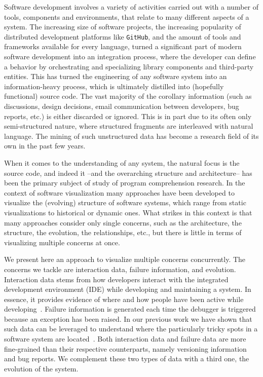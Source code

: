 Software development involves a variety of activities carried out with a number of tools, components and environments, that relate to many different aspects of a system.
The increasing size of software projects, the increasing popularity of distributed development platforms like \texttt{GitHub}, and the amount of tools and frameworks available for every language, turned a significant part of modern software development into an integration process, where the developer can define a behavior by orchestrating and specializing library components and third-party entities.
This has turned the engineering of any software system into an information-heavy process, which is ultimately distilled into (hopefully functional) source code.
The vast majority of the corollary information (such as discussions, design decisions, email communication between developers, bug reports, etc.) is either discarded or ignored.
This is in part due to its often only semi-structured nature, where structured fragments are interleaved with natural language.
The mining of such unstructured data has become a research field of its own in the past few years.

When it comes to the understanding of any system, the natural focus is the source code, and indeed it --and the overarching structure and architecture-- has been the primary subject of study of program comprehension research.
In the context of software visualization many approaches have been developed to visualize the (evolving) structure of software systems, which range from static visualizations to historical or dynamic ones.
What strikes in this context is that many approaches consider only single concerns, such as the architecture, the structure, the evolution, the relationships, etc., but there is little in terms of visualizing multiple concerns at once.

We present here an approach to visualize multiple concerns concurrently.
The concerns we tackle are interaction data, failure information, and evolution.
Interaction data stems from how developers interact with the integrated development environment (IDE) while developing and maintaining a system.
In essence, it provides evidence of where and how people have been active while developing~\cite{Mine2015b}.
Failure information is generated each time the debugger is triggered because an exception has been raised.
In our previous work we have shown that such data can be leveraged to understand where the particularly tricky spots in a software system are located~\cite{DalS2015a}.
Both interaction data and failure data are more fine-grained than their respective counterparts, namely versioning information and bug reports.
We complement these two types of data with a third one, the evolution of the system.

